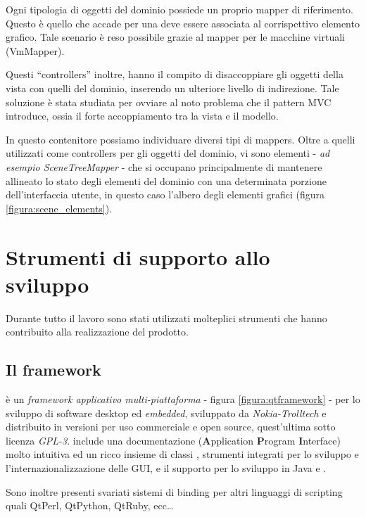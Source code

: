 Ogni tipologia di oggetti del dominio possiede un proprio mapper di riferimento. Questo è quello che accade per una \virtualmachine{} deve essere associata al corrispettivo elemento grafico. Tale scenario è reso possibile grazie al mapper per le macchine virtuali (VmMapper).

Questi ``controllers'' inoltre, hanno il compito di disaccoppiare gli oggetti della vista con quelli del dominio, inserendo un ulteriore livello di indirezione. Tale soluzione è stata studiata per ovviare al noto problema che il pattern MVC introduce, ossia il forte accoppiamento tra la vista e il modello.

In questo contenitore possiamo individuare diversi tipi di mappers. Oltre a quelli utilizzati come controllers per gli oggetti del dominio, vi sono elementi - \emph{ad esempio SceneTreeMapper} - che si occupano principalmente di mantenere allineato lo stato degli elementi del dominio con una determinata porzione dell'interfaccia utente, in questo caso l'albero degli elementi grafici (figura \ref{figura:scene_elements}).

\section{Strumenti di supporto allo sviluppo}
Durante tutto il lavoro sono stati utilizzati molteplici strumenti che hanno contribuito alla realizzazione del prodotto.

\subsection{Il framework \qt{}}
\qt{} è un \emph{framework applicativo multi-piattaforma} - figura \ref{figura:qtframework} - per lo sviluppo di software desktop ed \emph{embedded}, sviluppato da \emph{Nokia-Trolltech} e distribuito in versioni per uso commerciale e open source, quest'ultima sotto licenza \emph{GPL-3}. \qt{} include una documentazione (\textbf{A}pplication \textbf{P}rogram \textbf{I}nterface) molto intuitiva ed un ricco insieme di classi \cpp{}, strumenti integrati per lo sviluppo e l'internazionalizzazione delle GUI, e il supporto per lo sviluppo in Java e \cpp{}.

Sono inoltre presenti svariati sistemi di binding per altri linguaggi di scripting quali QtPerl, QtPython, QtRuby, ecc\ldots

